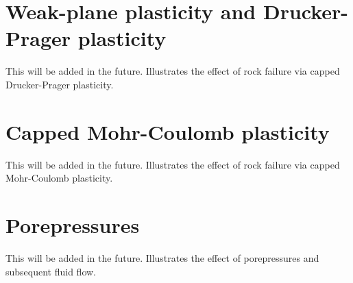 \documentclass[]{scrreprt}
\begin{document}
\chapter{Weak-plane plasticity and Drucker-Prager plasticity}

This will be added in the future.  Illustrates the effect of rock
failure via capped Drucker-Prager plasticity.

\chapter{Capped Mohr-Coulomb plasticity}

This will be added in the future.  Illustrates the effect of rock
failure via capped Mohr-Coulomb plasticity.

\chapter{Porepressures}

This will be added in the future.  Illustrates the effect of
porepressures and subsequent fluid flow.
\end{document}
